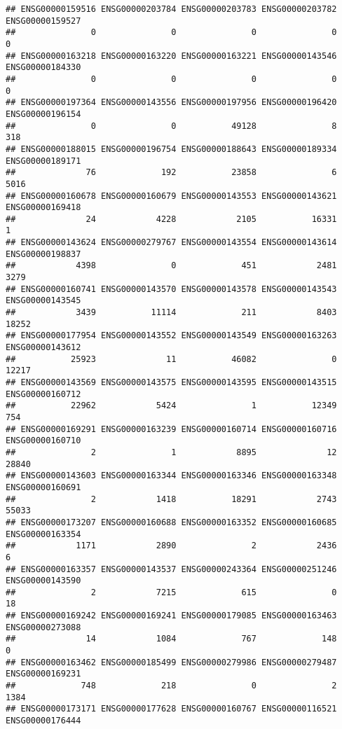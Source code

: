 \documentclass[
]{article}
\begin{document}
\begin{verbatim}
## ENSG00000159516 ENSG00000203784 ENSG00000203783 ENSG00000203782 ENSG00000159527 
##               0               0               0               0               0 
## ENSG00000163218 ENSG00000163220 ENSG00000163221 ENSG00000143546 ENSG00000184330 
##               0               0               0               0               0 
## ENSG00000197364 ENSG00000143556 ENSG00000197956 ENSG00000196420 ENSG00000196154 
##               0               0           49128               8             318 
## ENSG00000188015 ENSG00000196754 ENSG00000188643 ENSG00000189334 ENSG00000189171 
##              76             192           23858               6            5016 
## ENSG00000160678 ENSG00000160679 ENSG00000143553 ENSG00000143621 ENSG00000169418 
##              24            4228            2105           16331               1 
## ENSG00000143624 ENSG00000279767 ENSG00000143554 ENSG00000143614 ENSG00000198837 
##            4398               0             451            2481            3279 
## ENSG00000160741 ENSG00000143570 ENSG00000143578 ENSG00000143543 ENSG00000143545 
##            3439           11114             211            8403           18252 
## ENSG00000177954 ENSG00000143552 ENSG00000143549 ENSG00000163263 ENSG00000143612 
##           25923              11           46082               0           12217 
## ENSG00000143569 ENSG00000143575 ENSG00000143595 ENSG00000143515 ENSG00000160712 
##           22962            5424               1           12349             754 
## ENSG00000169291 ENSG00000163239 ENSG00000160714 ENSG00000160716 ENSG00000160710 
##               2               1            8895              12           28840 
## ENSG00000143603 ENSG00000163344 ENSG00000163346 ENSG00000163348 ENSG00000160691 
##               2            1418           18291            2743           55033 
## ENSG00000173207 ENSG00000160688 ENSG00000163352 ENSG00000160685 ENSG00000163354 
##            1171            2890               2            2436               6 
## ENSG00000163357 ENSG00000143537 ENSG00000243364 ENSG00000251246 ENSG00000143590 
##               2            7215             615               0              18 
## ENSG00000169242 ENSG00000169241 ENSG00000179085 ENSG00000163463 ENSG00000273088 
##              14            1084             767             148               0 
## ENSG00000163462 ENSG00000185499 ENSG00000279986 ENSG00000279487 ENSG00000169231 
##             748             218               0               2            1384 
## ENSG00000173171 ENSG00000177628 ENSG00000160767 ENSG00000116521 ENSG00000176444 

\end{verbatim}
\end{document}

